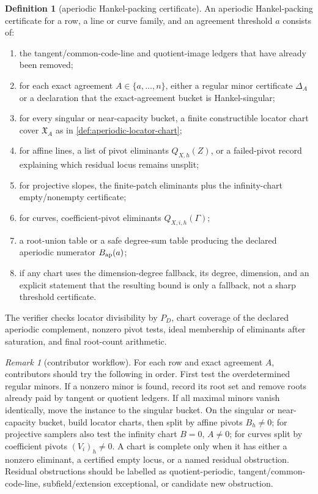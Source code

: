 \documentclass[11pt]{article}
\theoremstyle{definition}
\newtheorem{definition}[theorem]{Definition}
\theoremstyle{remark}
\newtheorem{remark}[theorem]{Remark}
\begin{document}
\begin{definition}[aperiodic Hankel-packing certificate]
\label{def:aperiodic-hankel-certificate}
An aperiodic Hankel-packing certificate for a row, a line or curve family, and an
agreement threshold $a$ consists of:
\begin{enumerate}[label=\textup{(\roman*)},leftmargin=2.2em]
\item the tangent/common-code-line and quotient-image ledgers that have already
been removed;
\item for each exact agreement $A\in\{a,\ldots,n\}$, either a regular minor
certificate $\Delta_A$ or a declaration that the exact-agreement bucket is
Hankel-singular;
\item for every singular or near-capacity bucket, a finite constructible locator
chart cover $\mathfrak X_A$ as in \cref{def:aperiodic-locator-chart};
\item for affine lines, a list of pivot eliminants $Q_{X,h}(Z)$, or a failed-pivot
record explaining which residual locus remains unsplit;
\item for projective slopes, the finite-patch eliminants plus the infinity-chart
empty/nonempty certificate;
\item for curves, coefficient-pivot eliminants $Q_{X,i,h}(\Gamma)$;
\item a root-union table or a safe degree-sum table producing the declared
aperiodic numerator $B_{\rm ap}(a)$;
\item if any chart uses the dimension-degree fallback, its degree, dimension, and
an explicit statement that the resulting bound is only a fallback, not a sharp
threshold certificate.
\end{enumerate}
The verifier checks locator divisibility by $P_D$, chart coverage of the declared
aperiodic complement, nonzero pivot tests, ideal membership of eliminants after
saturation, and final root-count arithmetic.
\end{definition}

\begin{remark}[contributor workflow]
\label{rem:aperiodic-contributor-workflow}
For each row and exact agreement $A$, contributors should try the following in
order.  First test the overdetermined regular minors.  If a nonzero minor is
found, record its root set and remove roots already paid by tangent or quotient
ledgers.  If all maximal minors vanish identically, move the instance to the
singular bucket.  On the singular or near-capacity bucket, build locator charts,
then split by affine pivots $B_h\ne0$; for projective samplers also test the
infinity chart $B=0$, $A\ne0$; for curves split by coefficient pivots
$(V_i)_h\ne0$.  A chart is complete only when it has either a nonzero eliminant,
a certified empty locus, or a named residual obstruction.  Residual obstructions
should be labelled as quotient-periodic, tangent/common-code-line,
subfield/extension exceptional, or candidate new obstruction.
\end{remark}
\end{document}
